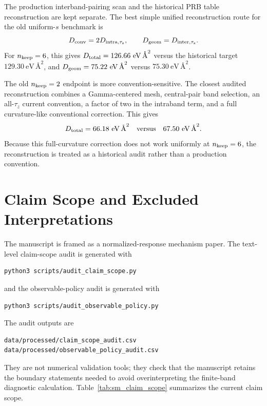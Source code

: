 \documentclass[aps,prb,preprint,superscriptaddress,floatfix,nofootinbib]{revtex4-2}
\begin{document}
The production interband-pairing scan and the historical PRB table
reconstruction are kept separate.  The best simple unified reconstruction route
for the old uniform-$s$ benchmark is
\begin{equation}
  D_{\rm conv}=2D_{\rm intra,\tau_z},
  \qquad
  D_{\rm geom}=D_{\rm inter,\tau_z}.
\end{equation}
For $n_{\rm keep}=6$, this gives $D_{\rm total}=126.66~\mathrm{eV}\,\text{\AA}^2$
versus the historical target $129.30~\mathrm{eV}\,\text{\AA}^2$, and
$D_{\rm geom}=75.22~\mathrm{eV}\,\text{\AA}^2$ versus
$75.30~\mathrm{eV}\,\text{\AA}^2$.

The old $n_{\rm keep}=2$ endpoint is more convention-sensitive.  The closest
audited reconstruction combines a Gamma-centered mesh, central-pair band
selection, an all-$\tau_z$ current convention, a factor of two in the intraband
term, and a full curvature-like conventional correction.  This gives
\begin{equation}
  D_{\rm total}=66.18~\mathrm{eV}\,\text{\AA}^2
  \quad
  \text{versus}
  \quad
  67.50~\mathrm{eV}\,\text{\AA}^2.
\end{equation}
Because this full-curvature correction does not work uniformly at
$n_{\rm keep}=6$, the reconstruction is treated as a historical audit rather
than a production convention.

\section{Claim Scope and Excluded Interpretations}

The manuscript is framed as a normalized-response mechanism paper.  The
text-level claim-scope audit is generated with
\begin{verbatim}
python3 scripts/audit_claim_scope.py
\end{verbatim}
and the observable-policy audit is generated with
\begin{verbatim}
python3 scripts/audit_observable_policy.py
\end{verbatim}
The audit outputs are
\begin{verbatim}
data/processed/claim_scope_audit.csv
data/processed/observable_policy_audit.csv
\end{verbatim}
They are not numerical validation tools; they check that the manuscript
retains the boundary statements needed to avoid overinterpreting the
finite-band diagnostic calculation.  Table~\ref{tab:sm_claim_scope}
summarizes the current claim scope.
\end{document}
